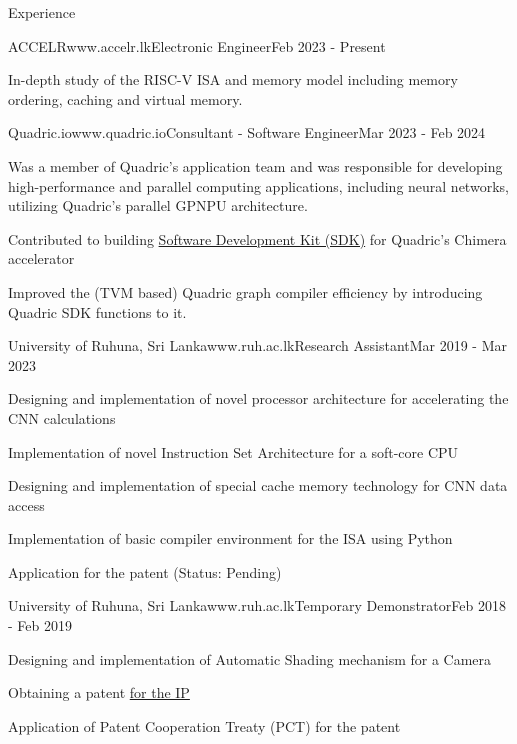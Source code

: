 \documentclass[
	11pt, %
]{./assets/resume} %
\begin{document}
\begin{rSection}{Experience}

	\begin{rSubsectionX}{ACCELR}{www.accelr.lk}{Electronic Engineer}{Feb 2023 - Present}
		\item In-depth study of the RISC-V ISA and memory model including memory ordering, caching and virtual memory.
	\end{rSubsectionX}

	\begin{rSubsectionX}{Quadric.io}{www.quadric.io}{Consultant - Software Engineer}{Mar 2023 - Feb 2024}
        \item Was a member of Quadric's application team and was responsible for developing high-performance and parallel computing applications, including neural networks, utilizing Quadric's parallel GPNPU architecture.
        \item Contributed to building \href{https://quadric.io/sdk/}{Software Development Kit (SDK)} for Quadric's Chimera accelerator
        \item Improved the (TVM based) Quadric graph compiler efficiency by introducing Quadric SDK functions to it.
    \end{rSubsectionX}

	\begin{rSubsectionX}{University of Ruhuna, Sri Lanka}{www.ruh.ac.lk}{Research Assistant}{Mar 2019 - Mar 2023}
		\item Designing and implementation of novel processor architecture for accelerating the CNN calculations
		\item Implementation of novel Instruction Set Architecture for a soft-core CPU
		\item Designing and implementation of special cache memory technology for CNN data access
		\item Implementation of basic compiler environment for the ISA using Python
		\item Application for the patent (Status: Pending)
	\end{rSubsectionX}


	\begin{rSubsectionX}{University of Ruhuna, Sri Lanka}{www.ruh.ac.lk}{Temporary Demonstrator}{Feb 2018 - Feb 2019}
		\item Designing and implementation of Automatic Shading mechanism for a Camera
		\item Obtaining a patent \href{https://patentscope.wipo.int/search/en/detail.jsf?docId=WO2021069993&_cid=P20-LSKB9J-42754-1}{for the IP}
		\item Application of Patent Cooperation Treaty (PCT) for the patent 
	\end{rSubsectionX}

\end{rSection}
\end{document}
